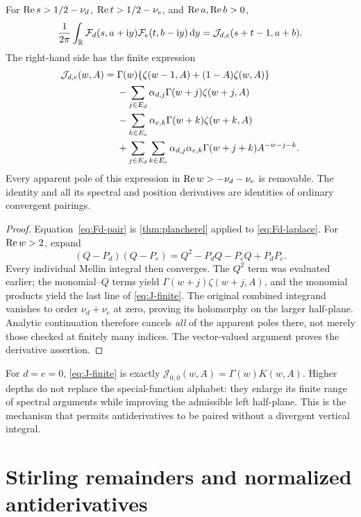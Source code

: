 \begin{theorem}\label{thm:depth-closure}
For $\operatorname{Re} s>1/2-\nu_d$, $\operatorname{Re} t>1/2-\nu_e$, and
$\operatorname{Re} a,\operatorname{Re} b>0$,
\begin{equation}\label{eq:Fd-pair}
 \frac1{2\pi}\int_{\mathbb R}\mathcal F_d(s,a+\mathrm i y)
                         \mathcal F_e(t,b-\mathrm i y)\,\mathrm d y
       =\mathcal J_{d,e}(s+t-1,a+b).
\end{equation}
The right-hand side has the finite expression
\begin{align}
 \mathcal J_{d,e}(w,A)={}&
 \Gamma(w)\{\zeta(w-1,A)+(1-A)\zeta(w,A)\}\notag\\
 &-\sum_{j\in E_d}\alpha_{d,j}\Gamma(w+j)\zeta(w+j,A)\notag\\
 &-\sum_{k\in E_e}\alpha_{e,k}\Gamma(w+k)\zeta(w+k,A)\notag\\
 &+\sum_{j\in E_d}\sum_{k\in E_e}
   \alpha_{d,j}\alpha_{e,k}\Gamma(w+j+k)A^{-w-j-k}.
                  \label{eq:J-finite}
\end{align}
Every apparent pole of this expression in
$\operatorname{Re} w>-\nu_d-\nu_e$ is removable. The identity and all its spectral
and position derivatives are identities of ordinary convergent pairings.
\end{theorem}
\begin{proof}
Equation~\eqref{eq:Fd-pair} is \cref{thm:plancherel} applied to
\eqref{eq:Fd-laplace}. For $\operatorname{Re} w>2$, expand
\[
 (Q-P_d)(Q-P_e)=Q^2-P_dQ-P_eQ+P_dP_e.
\]
Every individual Mellin integral then converges. The $Q^2$ term was
evaluated earlier; the monomial--$Q$ terms yield
$\Gamma(w+j)\zeta(w+j,A)$, and the monomial products yield the last
line of \eqref{eq:J-finite}. The original combined integrand vanishes
to order $\nu_d+\nu_e$ at zero, proving its holomorphy on the larger
half-plane. Analytic continuation therefore cancels \emph{all} of the
apparent poles there, not merely those checked at finitely many indices.
The vector-valued argument proves the derivative assertion.
\end{proof}

For $d=e=0$, \eqref{eq:J-finite} is exactly
$\mathcal J_{0,0}(w,A)=\Gamma(w)K(w,A)$. Higher depths do not replace the
special-function alphabet: they enlarge its finite range of spectral
arguments while improving the admissible left half-plane. This is the
mechanism that permits antiderivatives to be paired without a divergent
vertical integral.

\section{Stirling remainders and normalized antiderivatives}
\label{sec:primitives}


